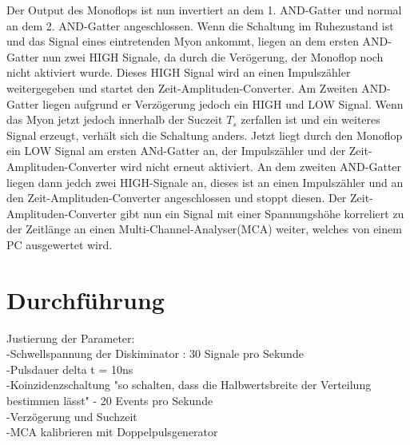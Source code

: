     Der Output des Monoflops ist nun invertiert an dem 1. AND-Gatter und normal an dem 2. AND-Gatter angeschlossen.
    Wenn die Schaltung im Ruhezustand ist und das Signal eines eintretenden Myon ankommt, liegen an dem ersten AND-Gatter nun zwei HIGH Signale, da durch die Verögerung, der Monoflop noch nicht aktiviert wurde.
    Dieses HIGH Signal wird an einen Impulszähler weitergegeben und startet den Zeit-Amplituden-Converter.
    Am Zweiten AND-Gatter liegen aufgrund er Verzögerung jedoch ein HIGH und LOW Signal.
    Wenn das Myon jetzt jedoch innerhalb der Suczeit $T_s$ zerfallen ist und ein weiteres Signal erzeugt, verhält sich die Schaltung anders.
    Jetzt liegt durch den Monoflop ein LOW Signal am ersten ANd-Gatter an, der Impulszähler und der Zeit-Amplituden-Converter wird nicht erneut aktiviert.
    An dem zweiten AND-Gatter liegen dann jedch zwei HIGH-Signale an, dieses ist an einen Impulszähler und an den Zeit-Amplituden-Converter angeschlossen und stoppt diesen.
    Der Zeit-Amplituden-Converter gibt nun ein Signal mit einer Spannungshöhe korreliert zu der Zeitlänge an einen Multi-Channel-Analyser(MCA) weiter, welches von einem PC ausgewertet wird.

\section{Durchführung}

    Justierung der Parameter:\\
    -Schwellspannung der Diskiminator : 30 Signale pro Sekunde\\
    -Pulsdauer delta t = 10ns\\
    -Koinzidenzschaltung "so schalten, dass die Halbwertsbreite der Verteilung bestimmen lässt" - 20 Events pro Sekunde\\
    -Verzögerung und Suchzeit \\
    -MCA kalibrieren mit Doppelpulsgenerator\\